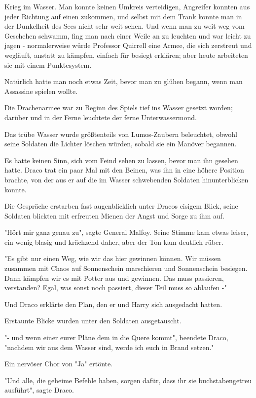 {Krieg im Wasser. Man konnte keinen Umkreis verteidigen, Angreifer konnten aus jeder Richtung auf einen zukommen, und selbst mit dem Trank konnte man in der Dunkelheit des Sees nicht sehr weit sehen. Und wenn man zu weit weg vom Geschehen schwamm, fing man nach einer Weile an zu leuchten und war leicht zu jagen - normalerweise würde Professor Quirrell eine Armee, die sich zerstreut und wegläuft, anstatt zu kämpfen, einfach für besiegt erklären; aber heute arbeiteten sie mit einem Punktesystem.

Natürlich hatte man noch etwas Zeit, bevor man zu glühen begann, wenn man Assassine spielen wollte.

Die Drachenarmee war zu Beginn des Spiels tief ins Wasser gesetzt worden; darüber und in der Ferne leuchtete der ferne Unterwassermond.

Das trübe Wasser wurde größtenteils von Lumos-Zaubern beleuchtet, obwohl seine Soldaten die Lichter löschen würden, sobald sie ein Manöver begannen.

Es hatte keinen Sinn, sich vom Feind sehen zu lassen, bevor man ihn gesehen hatte. Draco trat ein paar Mal mit den Beinen, was ihn in eine höhere Position brachte, von der aus er auf die im Wasser schwebenden Soldaten hinunterblicken konnte.

Die Gespräche erstarben fast augenblicklich unter Dracos eisigem Blick, seine Soldaten blickten mit erfreuten Mienen der Angst und Sorge zu ihm auf.

"Hört mir ganz genau zu", sagte General Malfoy. Seine Stimme kam etwas leiser, ein wenig blasig und krächzend daher, aber der Ton kam deutlich rüber.

"Es gibt nur einen Weg, wie wir das hier gewinnen können. Wir müssen zusammen mit Chaos auf Sonnenschein marschieren und Sonnenschein besiegen. Dann kämpfen wir es mit Potter aus und gewinnen. Das muss passieren, verstanden? Egal, was sonst noch passiert, dieser Teil muss so ablaufen -"

Und Draco erklärte den Plan, den er und Harry sich ausgedacht hatten.

Erstaunte Blicke wurden unter den Soldaten ausgetauscht.

"- und wenn einer eurer Pläne dem in die Quere kommt", beendete Draco, "nachdem wir aus dem Wasser sind, werde ich euch in Brand setzen."

Ein nervöser Chor von "Ja" ertönte.

"Und alle, die geheime Befehle haben, sorgen dafür, dass ihr sie buchstabengetreu ausführt", sagte Draco.

}
